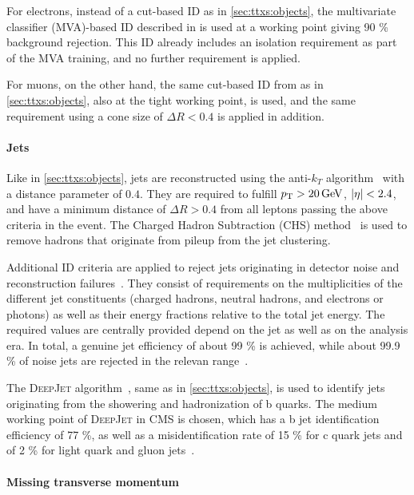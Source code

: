 For electrons, instead of a cut-based ID as in \cref{sec:ttxs:objects}, the multivariate classifier (MVA)-based ID described in  is used at a working point giving 90 \% background rejection. This ID already includes an isolation requirement as part of the MVA training, and no further requirement is applied.

For muons, on the other hand, the same cut-based ID from  as in \cref{sec:ttxs:objects}, also at the tight working point, is used, and the same \Irel requirement using a cone size of $\Delta R < 0.4$ is applied in addition.

\paragraph{Jets} 

Like in \cref{sec:ttxs:objects}, jets are reconstructed using the anti-$k_T$ algorithm~\cite{Cacciari:2008gp} with a distance parameter of $0.4$. They are required to fulfill $\pt > \SI{20}{\GeV}$, $|\eta| < 2.4$, and have a minimum distance of $\Delta R > 0.4$ from all leptons passing the above criteria in the event. The Charged Hadron Subtraction (CHS) method~\cite{CMS:PRF-14-001} is used to remove hadrons that originate from pileup from the jet clustering.

Additional ID criteria are applied to reject jets originating in detector noise and reconstruction failures~\cite{CMS:2020ebo}. They consist of requirements on the multiplicities of the different jet constituents (charged hadrons, neutral hadrons, and electrons or photons) as well as their energy fractions relative to the total jet energy. The required values are centrally provided depend on the jet \abseta as well as on the analysis era. In total, a genuine jet efficiency of about 99 \% is achieved, while about 99.9 \% of noise jets are rejected in the relevan \abseta range~\cite{CMS:2020ebo}.

The \textsc{DeepJet} algorithm~\cite{DeepJet:2020}, same as in \cref{sec:ttxs:objects}, is used to identify jets originating from the showering and hadronization of b quarks. The medium working point of \textsc{DeepJet} in CMS is chosen, which has a b jet identification efficiency of 77 \%, as well as a misidentification rate of 15 \% for c quark jets and of 2 \% for light quark and gluon jets~\cite{CMS:BTV-16-002}.

\paragraph{Missing transverse momentum}

